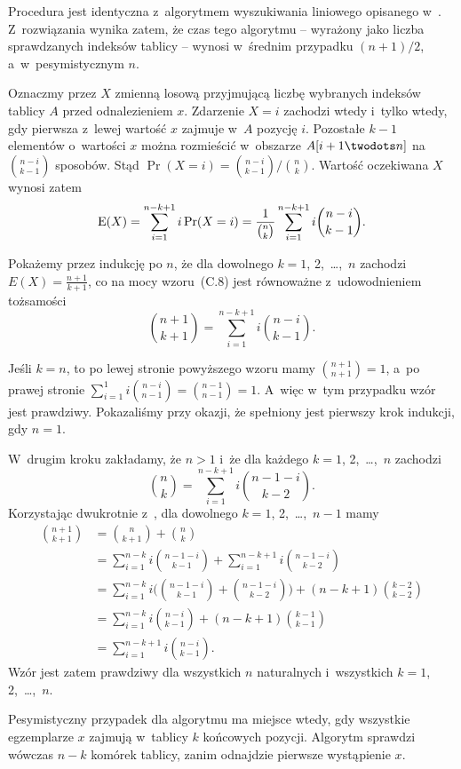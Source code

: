 \subproblem %
Procedura  jest identyczna z~algorytmem wyszukiwania liniowego opisanego w~. Z~rozwiązania  wynika zatem, że czas tego algorytmu -- wyrażony jako liczba sprawdzanych indeksów tablicy -- wynosi w~średnim przypadku $(n+1)/2$, a~w~pesymistycznym $n$.

\subproblem %
Oznaczmy przez $X$ zmienną losową przyjmującą liczbę wybranych indeksów tablicy $A$ przed odnalezieniem $x$. Zdarzenie $X=i$ zachodzi wtedy i~tylko wtedy, gdy pierwsza z~lewej wartość $x$ zajmuje w~$A$ pozycję $i$. Pozostałe $k-1$ elementów o~wartości $x$ można rozmieścić w~obszarze $A[i+1\twodots n]$ na $\binom{n-i}{k-1}$ sposobów. Stąd $\Pr(X=i)=\binom{n-i}{k-1}/\binom{n}{k}$. Wartość oczekiwana $X$ wynosi zatem
\[
    \operatorname{E}(X) = \sum_{i=1}^{n-k+1}i\Pr(X=i) = \frac{1}{\binom{n}{k}}\sum_{i=1}^{n-k+1}i\binom{n-i}{k-1}.
\]

Pokażemy przez indukcję po $n$, że dla dowolnego $k=1$, 2,~\dots,~$n$ zachodzi $E(X)=\frac{n+1}{k+1}$, co na mocy wzoru~(C.8) jest równoważne z~udowodnieniem tożsamości
\[
    \binom{n+1}{k+1} = \sum_{i=1}^{n-k+1}i\binom{n-i}{k-1}.
\]

Jeśli $k=n$, to po lewej stronie powyższego wzoru mamy $\binom{n+1}{n+1}=1$, a~po prawej stronie $\sum_{i=1}^1i\binom{n-i}{n-1}=\binom{n-1}{n-1}=1$. A~więc w~tym przypadku wzór jest prawdziwy. Pokazaliśmy przy okazji, że spełniony jest pierwszy krok indukcji, gdy $n=1$.

W~drugim kroku zakładamy, że $n>1$ i~że dla każdego $k=1$, 2,~\dots,~$n$ zachodzi
\[
    \binom{n}{k} = \sum_{i=1}^{n-k+1}i\binom{n-1-i}{k-2}.
\]
Korzystając dwukrotnie z~, dla dowolnego $k=1$, 2,~\dots,~$n-1$ mamy
\begin{align*}
    \binom{n+1}{k+1} &= \binom{n}{k+1}+\binom{n}{k} \\
	&= \sum_{i=1}^{n-k}i\binom{n-1-i}{k-1}+\sum_{i=1}^{n-k+1}i\binom{n-1-i}{k-2} \\
	&= \sum_{i=1}^{n-k}i\biggl(\binom{n-1-i}{k-1}+\binom{n-1-i}{k-2}\biggr)+(n-k+1)\binom{k-2}{k-2} \\
	&= \sum_{i=1}^{n-k}i\binom{n-i}{k-1}+(n-k+1)\binom{k-1}{k-1} \\
	&= \sum_{i=1}^{n-k+1}i\binom{n-i}{k-1}.
\end{align*}
Wzór jest zatem prawdziwy dla wszystkich $n$ naturalnych i~wszystkich $k=1$, 2,~\dots,~$n$.

Pesymistyczny przypadek dla algorytmu  ma miejsce wtedy, gdy wszystkie egzemplarze $x$ zajmują w~tablicy $k$ końcowych pozycji. Algorytm sprawdzi wówczas $n-k$ komórek tablicy, zanim odnajdzie pierwsze wystąpienie $x$.

